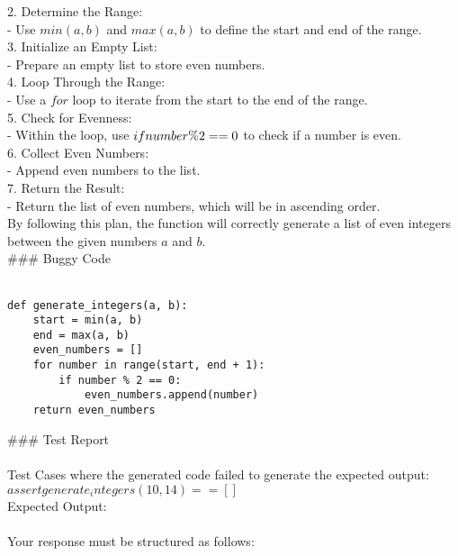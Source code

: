 2. \*\*Determine the Range:\*\* \\
   - Use $min(a, b)$ and $max(a, b)$ to define the start and end of the range. \\

3. \*\*Initialize an Empty List:\*\* \\
   - Prepare an empty list to store even numbers. \\

4. \*\*Loop Through the Range:\*\* \\
   - Use a $for$ loop to iterate from the start to the end of the range. \\

5. \*\*Check for Evenness:\*\* \\
   - Within the loop, use $if \space number \% 2 == 0$ to check if a number is even. \\

6. \*\*Collect Even Numbers:\*\* \\
   - Append even numbers to the list. \\

7. \*\*Return the Result:\*\* \\
   - Return the list of even numbers, which will be in ascending order. \\

By following this plan, the function will correctly generate a list of even integers between the given numbers $a$ and $b$. \\

\#\#\# Buggy Code \\
 \\
\begin{verbatim}
def generate_integers(a, b):
    start = min(a, b)
    end = max(a, b)
    even_numbers = []
    for number in range(start, end + 1):
        if number % 2 == 0:
            even_numbers.append(number)
    return even_numbers
\end{verbatim}

\#\#\# Test Report \\
 \\
Test Cases where the generated code failed to generate the expected output: \\
$assert generate_integers(10, 14) == []$ \\

\*\*Expected Output:\*\* \\
 \\
Your response must be structured as follows: \\

